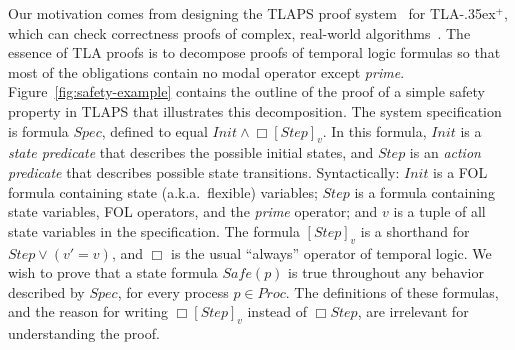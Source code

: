 \documentclass{easychair}
\renewcommand{\implies}{\Rightarrow}
\newcommand{\tlaplus}{\mbox{TLA\kern -.35ex$^+$}\xspace}
\newcommand{\edmargin}[2]{\marginpar{\raggedright\footnotesize\color{red}#1: #2}}
\newcommand{\edmargin}[2]{}
\def\llmargin{\edmargin{LL}}
\begin{document}
Our motivation comes from designing the TLAPS proof
system~\cite{cousineau:tlaps} for \tlaplus, which can check
correctness proofs of complex, real-world algorithms~\cite{lamport:byzantizing}.
The essence of TLA proofs is to decompose proofs of temporal logic formulas
so that most of the obligations
contain no modal operator except \emph{prime}. Figure~\ref{fig:safety-example}
contains the outline of the proof of a simple safety property in TLAPS that
illustrates this decomposition. The system
specification is formula $Spec$, defined to equal
  $Init \land \Box[Step]_v$.
In this formula, $Init$ is a \emph{state predicate} that describes the possible
initial states, and $Step$ is an \emph{action predicate} that describes
possible state transitions. Syntactically: $Init$ is a FOL formula containing
state (a.k.a.\ flexible) variables; $Step$ is a formula containing state
variables, FOL operators, and the \emph{prime} operator; and
$v$ is a tuple of all state variables in the specification.
The formula $[Step]_v$ is a shorthand for $Step \lor (v'=v)$, and $\Box$ is the
usual ``always'' operator of temporal logic.
%
%
We wish to prove that a state formula $Safe(p)$ is true throughout any behavior
described by $Spec$, for every process $p \in Proc$.
%
The definitions of these formulas, and the reason for writing $\Box[Step]_v$ instead
of $\Box Step$, are irrelevant for understanding the proof.

\end{document}
